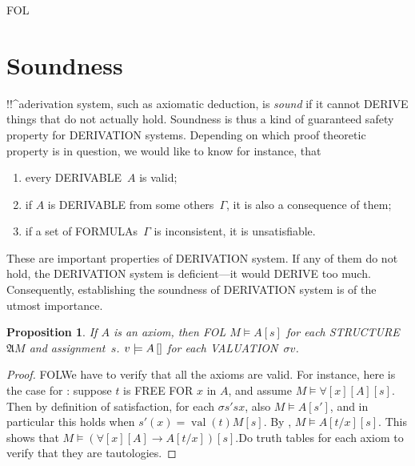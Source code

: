 \documentclass[10pt,a4paper]{article}
\makeatletter
\newcommand*{\olup}[1]{\MakeUppercase{#1}}
\theoremstyle{plain}
\newtheorem{prop}[thm]{Proposition}
\theoremstyle{definition}
\theoremstyle{remark}
\newenvironment{explain}{}{}
\newcommand*{\olfileid}[3]{}
\newcommand*{\olsection}[1]{\section*{#1}}
\newcommand{\olref}{\@ifnextchar[{\olref@i}{\olref@final}}
\def\olref@i[#1]{\@ifnextchar[{\olref@ii}{\olref@final}}
\def\olref@ii[#1]{\@ifnextchar[{\olref@iii}{\olref@final}}
\def\olref@iii[#1]{\olref@final}
\def\olref@final#1{\ref{#1}}
\providecommand{\lif}{\mathbin{\rightarrow}}
\providecommand{\lforall}{\mathord{\forall}}
\providecommand{\Subst}[3]{#1[#2/#3]}
\providecommand{\Struct}{\ensuremath{\mathfrak{A}}}
\providecommand{\Sat}[2]{\ensuremath{#1 \models #2}}
\providecommand{\iftag}[1]{#1}
\providecommand{\Value}[1]{\operatorname{val}(#1)}
\providecommand{\pSat}[3]{#1 \models #2\,[#3]}
\providecommand{\pAssign}{\sigma}
\providecommand{\varAssign}{\sigma}
\providecommand{\iftag}{}
\makeatother
\begin{document}



\iftag{FOL}
      {\olfileid{fol}{axd}{sou}}
      {\olfileid{pl}{axd}{sou}}
      
\olsection{Soundness}

\begin{explain}
!!^a{derivation} system, such as axiomatic deduction, is \emph{sound}
if it cannot \olup{derive} things that do not actually hold.  Soundness is
thus a kind of guaranteed safety property for \olup{derivation} systems.
Depending on which proof theoretic property is in question, we would
like to know for instance, that
\begin{enumerate}
\item every \olup{derivable}~$A$ is valid;
\item if $A$ is \olup{derivable} from some others~$\Gamma$, it is also a
  consequence of them;
\item if a set of \olup{formula}s~$\Gamma$ is inconsistent, it is
  unsatisfiable.
\end{enumerate}
These are important properties of \olup{derivation} system.  If any of them do
not hold, the \olup{derivation} system is deficient---it would \olup{derive} too much.
Consequently, establishing the soundness of \olup{derivation} system is of the
utmost importance.
\end{explain}

\begin{prop}
  If $A$ is an axiom, then
  \iftag{FOL}
    {$\Sat{M}{A}[s]$ for each \olup{structure}~$\Struct{M}$ and assignment~$s$.}
    {$\pSat{v}{A}$ for each \olup{valuation}~$\pAssign{v}$.}
\end{prop}

\begin{proof}
\iftag{FOL}{We have to verify that all the axioms are valid. For
  instance, here is the case for \olref[qua]{ax:q1}: suppose $t$ is
  \olup{free for} $x$ in $A$, and assume
  $\Sat{M}{\lforall[x][A]}[s]$. Then by definition of satisfaction,
  for each $\varAssign{s'}{s}{x}$, also $\Sat{M}{A}[s']$, and in particular
  this holds when $s'(x) = \Value{t}{M}[s]$. By
  \olref[syn][ext]{prop:ext-formulas},
  $\Sat{M}{\Subst{A}{t}{x}}[s]$. This shows that
  $\Sat{M}{(\lforall[x][A] \lif \Subst{A}{t}{x})}[s]$.}{Do truth
  tables for each axiom to verify that they are tautologies.}
\end{proof}
\end{document}
